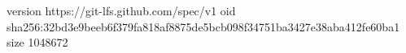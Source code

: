 version https://git-lfs.github.com/spec/v1
oid sha256:32bd3e9beeb6f379fa818af8875de5bcb098f34751ba3427e38aba412fe60ba1
size 1048672
